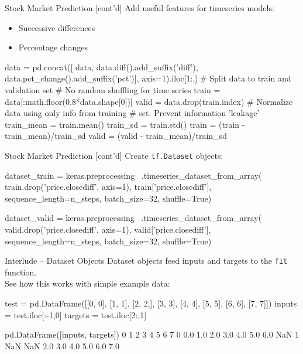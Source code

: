 \documentclass[ignorenonframetext,xcolor=x11names]{beamer}
\begin{document}
\begin{frame}[fragile]{Stock Market Prediction \small [cont'd]}
Add useful features for timeseries models:
\begin{itemize}
   \item Successive differences
   \item Percentage changes
\end{itemize}
\begin{pythoncode}
data = pd.concat([
    data,
    data.diff().add_suffix('diff'),
    data.pct_change().add_suffix('pct')],
    axis=1).iloc[1:,]
# Split data to train and validation set
# No random shuffling for time series
train = data[:math.floor(0.8*data.shape[0])]
valid = data.drop(train.index)
# Normalize data using only info from training 
# set. Prevent information 'leakage'
train_mean = train.mean()
train_sd = train.std()
train = (train - train_mean)/train_sd
valid = (valid - train_mean)/train_sd
\end{pythoncode}
\end{frame}

\begin{frame}[fragile]{Stock Market Prediction \small [cont'd]}
Create \texttt{tf.Dataset} objects:
\begin{pythoncode}
dataset_train = keras.preprocessing \
    .timeseries_dataset_from_array(
    train.drop('price.closediff', axis=1),
    train['price.closediff'],
    sequence_length=n_steps,
    batch_size=32,
    shuffle=True)

dataset_valid = keras.preprocessing \
    .timeseries_dataset_from_array(
    valid.drop('price.closediff', axis=1),
    valid['price.closediff'],
    sequence_length=n_steps,
    batch_size=32,
    shuffle=True)
\end{pythoncode}
\end{frame}

\begin{frame}[fragile]{Interlude -- Dataset Objects}
Dataset objects feed inputs and targets to the \texttt{fit} function. \\

See how this works with simple example data:
\begin{pythoncode}
test = pd.DataFrame([[0, 0], [1, 1], [2, 2,], [3, 3], 
                     [4, 4], [5, 5], [6, 6], [7, 7]]) 
inputs = test.iloc[:-1,0]
targets = test.iloc[2:,1]

pd.DataFrame([inputs, targets])
     0    1    2    3    4    5    6    7
0  0.0  1.0  2.0  3.0  4.0  5.0  6.0  NaN
1  NaN  NaN  2.0  3.0  4.0  5.0  6.0  7.0
\end{pythoncode}
\end{frame}
\end{document}

